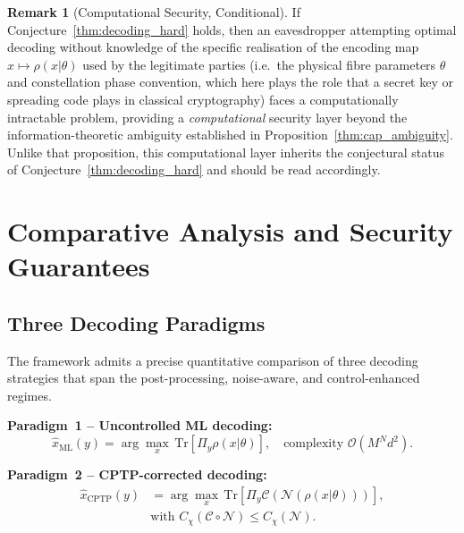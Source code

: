 \documentclass[journal,twocolumn]{IEEEtran}
\theoremstyle{definition}
\newtheorem{remark}[definition]{Remark}
\theoremstyle{plain}
\newcommand{\Tr}{\mathrm{Tr}}
\begin{document}
\begin{remark}[Computational Security, Conditional]
If Conjecture~\ref{thm:decoding_hard} holds, then an eavesdropper
attempting optimal decoding without knowledge of the specific
realisation of the encoding map $x\mapsto\rho(x|\theta)$ used by the
legitimate parties (i.e.\ the physical fibre parameters $\theta$ and
constellation phase convention, which here plays the role that a
secret key or spreading code plays in classical cryptography) faces
a computationally intractable problem, providing a
\emph{computational} security layer beyond the information-theoretic
ambiguity established in Proposition~\ref{thm:cap_ambiguity}. Unlike
that proposition, this computational layer inherits the conjectural
status of Conjecture~\ref{thm:decoding_hard} and should be read
accordingly.
\end{remark}

\section{Comparative Analysis and Security Guarantees}
\label{sec:security}

\subsection{Three Decoding Paradigms}

The framework admits a precise quantitative comparison of three
decoding strategies that span the post-processing, noise-aware,
and control-enhanced regimes.

\medskip\noindent\textbf{Paradigm~1 -- Uncontrolled ML decoding:}
\begin{equation}
  \hat x_{\mathrm{ML}}(y) = \arg\max_x\, \Tr[\Pi_y \rho(x|\theta)],
  \quad \text{complexity } \mathcal{O}(M^N d^2).
  \label{eq:paradigm1}
\end{equation}

\medskip\noindent\textbf{Paradigm~2 -- CPTP-corrected decoding:}
\begin{align}
  \hat x_{\mathrm{CPTP}}(y) &= \arg\max_x\,
    \Tr[\Pi_y \mathcal{C}(\mathcal{N}(\rho(x|\theta)))],
    \nonumber\\
  &\text{with } C_\chi(\mathcal{C} \circ \mathcal{N})
    \le C_\chi(\mathcal{N}).
  \label{eq:paradigm2}
\end{align}
\end{document}

